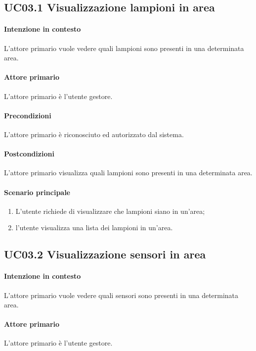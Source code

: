 \subsection{UC03.1 Visualizzazione lampioni in area}
\paragraph{Intenzione in contesto} L'attore primario vuole vedere quali lampioni sono presenti in una determinata area.

\paragraph{Attore primario} L'attore primario è l'utente gestore.
\paragraph{Precondizioni}L'attore primario è riconosciuto ed autorizzato dal sistema.
\paragraph{Postcondizioni} L'attore primario visualizza quali lampioni sono presenti in una determinata area.

\paragraph{Scenario principale}
\begin{enumerate}
    \item L'utente richiede di visualizzare che lampioni siano in un'area;
    \item l'utente visualizza una lista dei lampioni in un'area.
\end{enumerate}

\subsection{UC03.2 Visualizzazione sensori in area}
\paragraph{Intenzione in contesto} L'attore primario vuole vedere quali sensori sono presenti in una determinata area.
\paragraph{Attore primario} L'attore primario è l'utente gestore.
